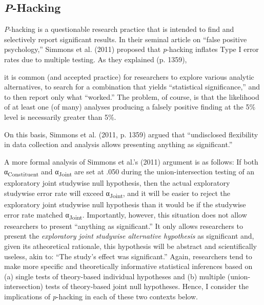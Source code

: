 \documentclass[authordate, empirical]{jote-new-article}
\begin{document}
	\subsection{\emph{P}-Hacking}



	\emph{P}-hacking is a questionable research practice that is intended to find and selectively report significant results. In their seminal article on “false positive psychology,” Simmons et al. (2011) proposed that \emph{p}-hacking inflates Type I error rates due to multiple testing. As they explained (p. 1359),



	it is common (and accepted practice) for researchers to explore various analytic alternatives, to search for a combination that yields “statistical significance,” and to then report only what “worked.” The problem, of course, is that the likelihood of at least one (of many) analyses producing a falsely positive finding at the 5\% level is necessarily greater than 5\%.



	On this basis, Simmons et al. (2011, p. 1359) argued that “undisclosed flexibility in data collection and analysis allows presenting anything as significant.”



	A more formal analysis of Simmons et al.'s (2011) argument is as follows: If both α\textsubscript{Constituent} and α\textsubscript{Joint} are set at .050 during the union-intersection testing of an exploratory joint studywise null hypothesis, then the actual exploratory studywise error rate will exceed α\textsubscript{Joint}, and it will be easier to reject the exploratory joint studywise null hypothesis than it would be if the studywise error rate matched α\textsubscript{Joint}. Importantly, however, this situation does not allow researchers to present “anything as significant.” It only allows researchers to present the\emph{ exploratory joint studywise alternative hypothesis} as significant and, given its atheoretical rationale, this hypothesis will be abstract and scientifically useless, akin to: “The study's effect was significant.” Again, researchers tend to make more specific and theoretically informative statistical inferences based on (a) single tests of theory-based individual hypotheses and (b) multiple (union-intersection) tests of theory-based joint null hypotheses. Hence, I consider the implications of \emph{p}-hacking in each of these two contexts below.
\end{document}
